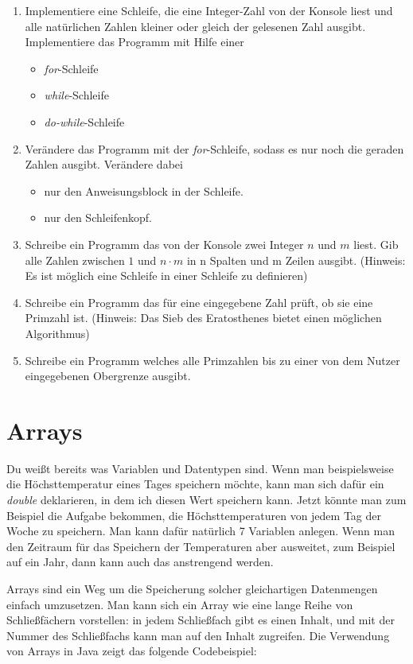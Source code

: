 \begin{enumerate}
	\item Implementiere eine Schleife, die eine Integer-Zahl von der Konsole liest und alle natürlichen Zahlen kleiner oder gleich der gelesenen Zahl ausgibt. Implementiere das Programm mit Hilfe einer
	\begin{itemize}
		\item \textit{for}-Schleife
		\item \textit{while}-Schleife
		\item \textit{do-while}-Schleife
	\end{itemize}
	\item Verändere das Programm mit der \textit{for}-Schleife, sodass es nur noch die geraden Zahlen ausgibt. Verändere dabei
	\begin{itemize}
		\item nur den Anweisungsblock in der Schleife.
		\item nur den Schleifenkopf.
	\end{itemize}
	\item Schreibe ein Programm das von der Konsole zwei Integer $n$ und $m$ liest. Gib alle Zahlen zwischen $1$ und $n\cdot m$ in n Spalten und m Zeilen ausgibt. (Hinweis: Es ist möglich eine Schleife in einer Schleife zu definieren)
	\item Schreibe ein Programm das für eine eingegebene Zahl prüft, ob sie eine Primzahl ist. (Hinweis: Das Sieb des Eratosthenes bietet einen möglichen Algorithmus)
	\item Schreibe ein Programm welches alle Primzahlen bis zu einer von dem Nutzer eingegebenen Obergrenze ausgibt.
\end{enumerate}

\section{Arrays}

Du weißt bereits was Variablen und Datentypen sind. Wenn man beispielsweise die Höchsttemperatur eines Tages speichern möchte, kann man sich dafür ein \textit{double} deklarieren, in dem ich diesen Wert speichern kann. Jetzt könnte man zum Beispiel die Aufgabe bekommen, die Höchsttemperaturen von jedem Tag der Woche zu speichern. Man kann dafür natürlich 7 Variablen anlegen. Wenn man den Zeitraum für das Speichern der Temperaturen aber ausweitet, zum Beispiel auf ein Jahr, dann kann auch das anstrengend werden.

Arrays sind ein Weg um die Speicherung solcher gleichartigen Datenmengen einfach umzusetzen. Man kann sich ein Array wie eine lange Reihe von Schließfächern vorstellen: in jedem Schließfach gibt es einen Inhalt, und mit der Nummer des Schließfachs kann man auf den Inhalt zugreifen. Die Verwendung von Arrays in Java zeigt das folgende Codebeispiel:

